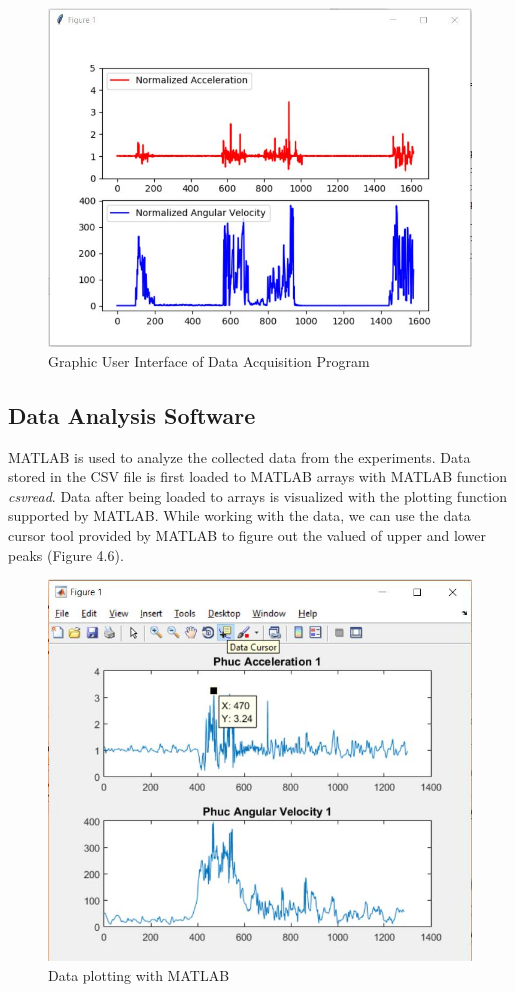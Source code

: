 \documentclass[letterpaper,12pt,titlepage,oneside,final]{book}
\begin{document}
\begin{figure}[h!]
	\centering
	\includegraphics[scale=0.7]{data_program}
	\caption{Graphic User Interface of Data Acquisition Program}
\end{figure} 
\subsection{Data Analysis Software}
MATLAB is used to analyze the collected data from the experiments. Data stored in the CSV file is first loaded to MATLAB arrays with MATLAB function \textit{csvread}. Data after being loaded to arrays is visualized with the plotting function supported by MATLAB. While working with the data, we can use the data cursor tool provided by MATLAB to figure out the valued of upper and lower peaks (Figure 4.6).
\begin{figure}[h!]
	\centering
	\includegraphics[scale=0.7]{matlab_window}
	\caption{Data plotting with MATLAB}
\end{figure}
\end{document}
